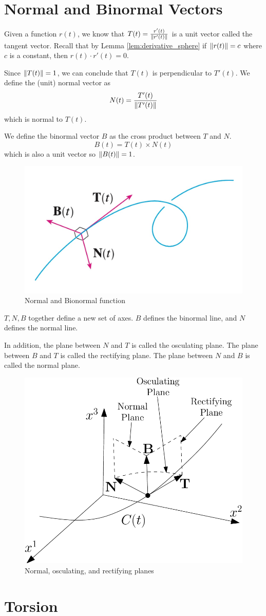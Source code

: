 \section{Normal and Binormal Vectors}

\begin{definition}
Given a function $r(t)$, we know that $T(t) = \frac{r'(t)}{\lVert r'(t) \rVert}$ is a unit vector called the tangent vector. Recall that by Lemma \ref{lem:derivative_sphere} if $\lVert r(t) \rVert=c$ where $c$ is a constant, then $r(t)\cdot r'(t) = 0$.

Since $\lVert T(t) \rVert=1$, we can conclude that $T(t)$ is perpendicular to $T'(t)$. We define the (unit) normal vector as
$$
N(t) = \frac{T'(t)}{\lVert T'(t) \rVert}
$$
which is normal to $T(t)$.
\end{definition}

\begin{definition}
We define the binormal vector $B$ as the cross product between $T$ and $N$.
$$
B(t) = T(t) \times N(t)
$$
which is also a unit vector so $\lVert B(t) \rVert=1$.
\end{definition}

\begin{figure}[h]
    \centering
    \includegraphics[width=0.3\linewidth]{figures/normal-binormal.jpeg}
    \caption{Normal and Bionormal function}
    \label{fig:normal_binormal_vec}
\end{figure}

$T,N,B$ together define a new set of axes. $B$ defines the binormal line, and $N$ defines the normal line.

In addition, the plane between $N$ and $T$ is called the osculating plane. The plane between $B$ and $T$ is called the rectifying plane. The plane between $N$ and $B$ is called the normal plane.

\begin{figure}[h]
    \centering
    \includegraphics[width=0.4\linewidth]{figures/NTB-planes.png}
    \caption{Normal, osculating, and rectifying planes}
    \label{fig:NTB_planes}
\end{figure}

\section{Torsion}